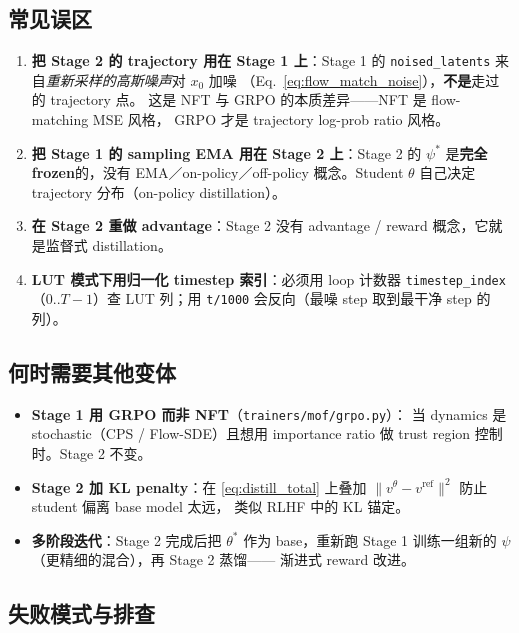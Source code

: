 \documentclass[11pt,a4paper]{article}
\theoremstyle{definition}
\begin{document}
\subsection{常见误区}

\begin{enumerate}[leftmargin=1.5em]
\item \textbf{把 Stage 2 的 trajectory 用在 Stage 1 上}：Stage 1 的
  \texttt{noised\_latents} 来自\emph{重新采样的高斯噪声}对 $x_0$ 加噪
  （Eq.~\eqref{eq:flow_match_noise}），\textbf{不是}走过的 trajectory 点。
  这是 NFT 与 GRPO 的本质差异——NFT 是 flow-matching MSE 风格，
  GRPO 才是 trajectory log-prob ratio 风格。
\item \textbf{把 Stage 1 的 sampling EMA 用在 Stage 2 上}：Stage 2 的
  $\psi^*$ 是\textbf{完全 frozen}的，没有 EMA／on-policy／off-policy
  概念。Student $\theta$ 自己决定 trajectory 分布（on-policy distillation）。
\item \textbf{在 Stage 2 重做 advantage}：Stage 2 没有 advantage / reward
  概念，它就是监督式 distillation。
\item \textbf{LUT 模式下用归一化 timestep 索引}：必须用 loop 计数器
  \texttt{timestep\_index}（0..$T{-}1$）查 LUT 列；用
  \texttt{t/1000} 会反向（最噪 step 取到最干净 step 的列）。
\end{enumerate}

\subsection{何时需要其他变体}

\begin{itemize}[leftmargin=1.5em]
\item \textbf{Stage 1 用 GRPO 而非 NFT}（\texttt{trainers/mof/grpo.py}）：
  当 dynamics 是 stochastic（CPS / Flow-SDE）且想用 importance ratio
  做 trust region 控制时。Stage 2 不变。
\item \textbf{Stage 2 加 KL penalty}：在 \eqref{eq:distill_total} 上叠加
  $\|v^\theta - v^{\text{ref}}\|^2$ 防止 student 偏离 base model 太远，
  类似 RLHF 中的 KL 锚定。
\item \textbf{多阶段迭代}：Stage 2 完成后把 $\theta^*$ 作为 base，重新跑
  Stage 1 训练一组新的 $\psi$（更精细的混合），再 Stage 2 蒸馏——
  渐进式 reward 改进。
\end{itemize}

\subsection{失败模式与排查}
\end{document}
